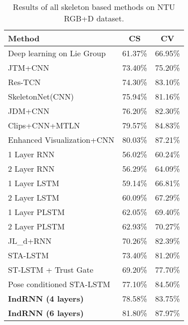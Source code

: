 \documentclass[10pt,twocolumn,letterpaper]{article}
\begin{document}
\begin{table}
\caption{Results of all skeleton based methods on NTU RGB+D dataset.}
\label{result_ntu}
\begin{center}
  \begin{tabular}{l c c}
  \hline
  Method & CS & CV \\
  \hline
  Deep learning on Lie Group \cite{huang2016deep} & 61.37\% & 66.95\%  \\
  \hline
  JTM+CNN \cite{wang2016action} & 73.40\% & 75.20\%  \\
  \hline
  Res-TCN \cite{kim2017interpretable} & 74.30\% & 83.10\%  \\
  \hline
  SkeletonNet(CNN) \cite{ke2017skeletonnet} & 75.94\% & 81.16\%  \\
  \hline
  JDM+CNN \cite{li2017joint} & 76.20\% & 82.30\%  \\
  \hline
  Clips+CNN+MTLN \cite{ke2017new} & 79.57\% & 84.83\%  \\
  \hline
  Enhanced Visualization+CNN \cite{liu2017enhanced} & 80.03\% & 87.21\%  \\
  \hline
  1 Layer RNN \cite{shahroudy2016ntu} & 56.02\% & 60.24\%  \\
  \hline
  2 Layer RNN \cite{shahroudy2016ntu} & 56.29\% & 64.09\%  \\
  \hline
  1 Layer LSTM \cite{shahroudy2016ntu} & 59.14\% & 66.81\%  \\
  \hline
  2 Layer LSTM \cite{shahroudy2016ntu} & 60.09\% & 67.29\%  \\
  \hline
  1 Layer PLSTM \cite{shahroudy2016ntu} & 62.05\% & 69.40\%  \\
  \hline
  2 Layer PLSTM \cite{shahroudy2016ntu} & 62.93\% & 70.27\%  \\
  \hline
  JL\_d+RNN \cite{zhang2017geometric} & 70.26\% & 82.39\%  \\
  \hline
  STA-LSTM \cite{song2017end} & 73.40\% & 81.20\%  \\
  \hline
  ST-LSTM + Trust Gate \cite{liu2016spatio} & 69.20\% & 77.70\%  \\
  \hline
  Pose conditioned STA-LSTM\cite{baradel2017pose} & 77.10\% & 84.50\%  \\
  \hline
  \textbf{IndRNN (4 layers)} & 78.58\% & 83.75\%  \\
  \hline
  \textbf{IndRNN (6 layers)} & 81.80\% & 87.97\%  \\
  \hline
  \end{tabular}
\end{center}
\end{table}
\end{document}
